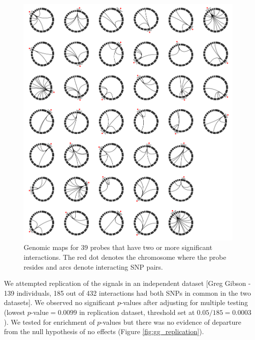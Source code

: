 \documentclass[paper=a4, fontsize=11pt]{scrartcl}	%
\numberwithin{equation}{section}									%
\numberwithin{figure}{section}										%
\numberwithin{table}{section}										%
\begin{document}
\begin{figure}[p]
	\centering
	\includegraphics[width=15cm]{images/circos}
	\caption{Genomic maps for 39 probes that have two or more significant interactions. The red dot denotes the chromosome where the probe resides and arcs denote interacting SNP pairs.}
	\label{fig:circos}
\end{figure}

We attempted replication of the signals in an independent dataset [Greg Gibson - 139 individuals, 185 out of 432 interactions had both SNPs in common in the two datasets]. We observed no significant $p$-values after adjusting for multiple testing (lowest $p$-value$=0.0099$ in replication dataset, threshold set at $0.05/185=0.0003$). We tested for enrichment of $p$-values but there was no evidence of departure from the null hypothesis of no effects (Figure \ref{fig:gg_replication}). 
\end{document}
